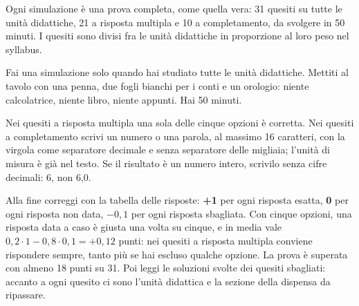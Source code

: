 \simulazioni

Ogni simulazione è una prova completa, come quella vera: 31 quesiti su tutte le unità didattiche, 21 a risposta multipla e 10 a completamento, da svolgere in 50 minuti. I quesiti sono divisi fra le unità didattiche in proporzione al loro peso nel syllabus.

\begin{tcolorbox}[fisbox={formula}{formulaBg},title={Come usare le simulazioni}]
Fai una simulazione solo quando hai studiato tutte le unità didattiche. Mettiti al tavolo con una penna, due fogli bianchi per i conti e un orologio: niente calcolatrice, niente libro, niente appunti. Hai 50 minuti.

Nei quesiti a risposta multipla una sola delle cinque opzioni è corretta. Nei quesiti a completamento scrivi un numero o una parola, al massimo 16 caratteri, con la virgola come separatore decimale e senza separatore delle migliaia; l'unità di misura è già nel testo. Se il risultato è un numero intero, scrivilo senza cifre decimali: 6, non 6,0.

Alla fine correggi con la tabella delle risposte: \textbf{+1} per ogni risposta esatta, \textbf{0} per ogni risposta non data, \textbf{$-0{,}1$} per ogni risposta sbagliata. Con cinque opzioni, una risposta data a caso è giusta una volta su cinque, e in media vale $0{,}2 \cdot 1 - 0{,}8 \cdot 0{,}1 = +0{,}12$ punti: nei quesiti a risposta multipla conviene rispondere sempre, tanto più se hai escluso qualche opzione. La prova è superata con almeno 18 punti su 31. Poi leggi le soluzioni svolte dei quesiti sbagliati: accanto a ogni quesito ci sono l'unità didattica e la sezione della dispensa da ripassare.
\end{tcolorbox}


